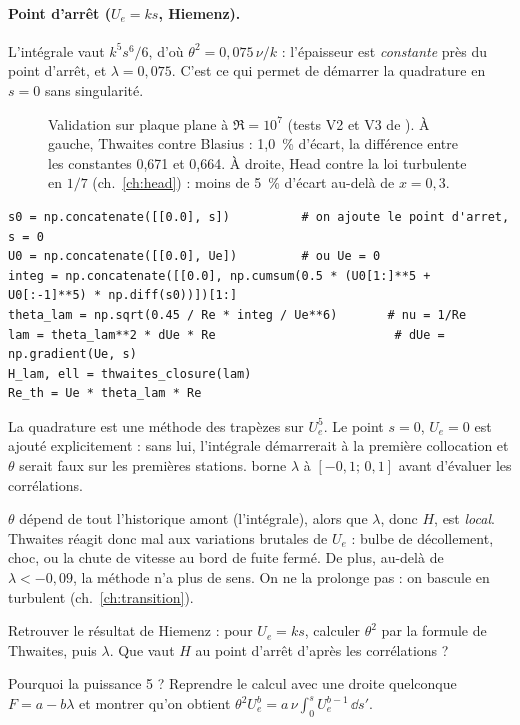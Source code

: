 \paragraph{Point d'arrêt ($U_e=ks$, Hiemenz).} L'intégrale vaut $k^5s^6/6$, d'où $\theta^2=0{,}075\,\nu/k$ : l'épaisseur est \emph{constante} près du point d'arrêt, et $\lambda=0{,}075$. C'est ce qui permet de démarrer la quadrature en $s=0$ sans singularité.

\begin{figure}[htbp]
\centering

\caption{Validation sur plaque plane à $\Re=10^7$ (tests V2 et V3 de ). À gauche, Thwaites contre Blasius : 1,0~\% d'écart, la différence entre les constantes 0,671 et 0,664. À droite, Head contre la loi turbulente en $1/7$ (ch.~\ref{ch:head}) : moins de 5~\% d'écart au-delà de $x=0{,}3$.}\label{fig:plaque}
\end{figure}

\begin{codebox}
\begin{lstlisting}
s0 = np.concatenate([[0.0], s])          # on ajoute le point d'arret, s = 0
U0 = np.concatenate([[0.0], Ue])         # ou Ue = 0
integ = np.concatenate([[0.0], np.cumsum(0.5 * (U0[1:]**5 + U0[:-1]**5) * np.diff(s0))])[1:]
theta_lam = np.sqrt(0.45 / Re * integ / Ue**6)       # nu = 1/Re
lam = theta_lam**2 * dUe * Re                         # dUe = np.gradient(Ue, s)
H_lam, ell = thwaites_closure(lam)
Re_th = Ue * theta_lam * Re
\end{lstlisting}
La quadrature est une méthode des trapèzes sur $U_e^5$. Le point $s=0$, $U_e=0$ est ajouté explicitement : sans lui, l'intégrale démarrerait à la première collocation et $\theta$ serait faux sur les premières stations.  borne $\lambda$ à $[-0{,}1;\,0{,}1]$ avant d'évaluer les corrélations.
\end{codebox}

\begin{piege}
$\theta$ dépend de tout l'historique amont (l'intégrale), alors que $\lambda$, donc $H$, est \emph{local}. Thwaites réagit donc mal aux variations brutales de $U_e$ : bulbe de décollement, choc, ou la chute de vitesse au bord de fuite fermé. De plus, au-delà de $\lambda<-0{,}09$, la méthode n'a plus de sens. On ne la prolonge pas : on bascule en turbulent (ch.~\ref{ch:transition}).
\end{piege}

\exercices
\begin{exercice}
Retrouver le résultat de Hiemenz : pour $U_e=ks$, calculer $\theta^2$ par la formule de Thwaites, puis $\lambda$. Que vaut $H$ au point d'arrêt d'après les corrélations ?
\end{exercice}
\begin{exercice}
Pourquoi la puissance 5 ? Reprendre le calcul avec une droite quelconque $F=a-b\lambda$ et montrer qu'on obtient $\theta^2U_e^{b}=a\,\nu\int_0^sU_e^{b-1}\,\dd s'$.
\end{exercice}
